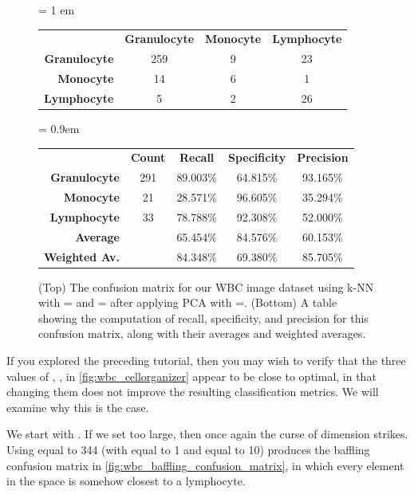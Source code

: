 \begin{figure}[h]
\centering
\tabcolsep = 1 em
\mySfFamily
\begin{tabular}{r c c c}
\rowcolor{gray!50}
& \textbf{Granulocyte} & \textbf{Monocyte} & \textbf{Lymphocyte} \\
\textbf{Granulocyte} & 259 & 9 & 23 \\
\textbf{Monocyte} & \phantom{5}14 & 6 & \phantom{5}1 \\
 \textbf{Lymphocyte} & \phantom{55}5 & 2 & 26
\end{tabular}

\phantom{Test}\vspace{\baselineskip}

\tabcolsep = 0.9em
\begin{tabular}{r c c c c}
\rowcolor{gray!50}
& \textbf{Count} & \textbf{Recall} & \textbf{Specificity} & \textbf{Precision} \\
\textbf{Granulocyte} & 291 & 89.003\% & 64.815\% & 93.165\%\\
\textbf{Monocyte} & 21 & 28.571\% & 96.605\% & 35.294\% \\
\textbf{Lymphocyte} & 33 & 78.788\% & 92.308\% & 52.000\%\\
\textbf{Average} & & 65.454\% & 84.576\% & 60.153\%\\
\textbf{Weighted Av.} & & 84.348\% & 69.380\% & 85.705\%\\
\end{tabular}
\caption{(Top) The confusion matrix for our WBC image dataset using k-NN with = and = after applying PCA with =. (Bottom) A table showing the computation of recall, specificity, and precision for this confusion matrix, along with their averages and weighted averages.}
\label{fig:wbc_cellorganizer}
\end{figure}

If you explored the preceding tutorial, then you may wish to verify that the three values of , ,  in \autoref{fig:wbc_cellorganizer} appear to be close to optimal, in that changing them does not improve the resulting classification metrics. We will examine why this is the case.

We start with . If we set  too large, then once again the curse of dimension strikes. Using  equal to 344 (with  equal to 1 and  equal to 10) produces the baffling confusion matrix in \autoref{fig:wbc_baffling_confusion_matrix}, in which every element in the space is somehow closest to a lymphocyte.\\

